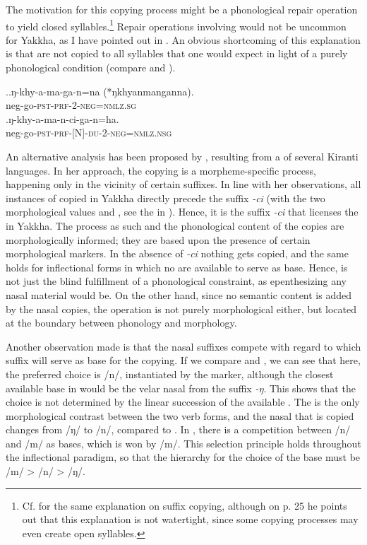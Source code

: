 	
The motivation for this copying process might be a phonological repair operation to yield closed syllables.\footnote{Cf. \citet[22]{Schikowski2012_Morphology} for the same explanation on  suffix copying, although on p. 25 he points out that this explanation is not watertight, since some copying processes may even create open syllables.} Repair operations involving  would not be uncommon for Yakkha, as I have pointed out in . An obvious shortcoming of this explanation is that  are not copied to all syllables that one would expect in light of a purely phonological condition (compare \Next[a] and \Next[b]). 


\ex.\ag.ŋ-khy-a-ma-ga-n=na (*ŋkhyanmanganna).\\
{\sc neg-}go\textsc{-pst-prf-2-neg=nmlz.sg}\\
\bg.ŋ-khy-a-ma-n-ci-ga-n=ha.\\
{\sc neg-}go\textsc{-pst-prf-[N]-du-2-neg=nmlz.nsg}\\


An alternative analysis has been proposed by \citet{Zimmermann2012_Affix}, resulting from a  of several Kiranti languages. In her approach, the copying is a morpheme-specific process, happening only in the vicinity of certain suffixes. In line with her observations, all instances of copied  in Yakkha directly precede the suffix  \emph{-ci} (with the two morphological values  and , see the  in ). Hence, it is the suffix \emph{-ci} that licenses the  in Yakkha. The process as such and the phonological content of the copies are morphologically informed; they are based upon the presence of certain morphological markers. In the absence of \emph{-ci} nothing gets copied, and the same holds for inflectional forms in which no  are available to serve as base. Hence,  is not just the blind fulfillment of a phonological constraint, as epenthesizing any nasal material would be. On the other hand, since no semantic content is added by the nasal copies, the operation is not purely morphological either, but located at the boundary between phonology and morphology.


Another observation made is that the nasal suffixes compete with regard to which suffix will serve as base for the copying. If we compare \Next[a] and \Next[b], we can see that here, the preferred choice is /n/, instantiated by  the  marker, although the closest available base in \Next[b] would be the velar nasal from the suffix \emph{-ŋ}. This shows that the choice is not determined by the linear succession of the available . The  is the only morphological contrast between the two verb forms, and the nasal that is copied changes from /ŋ/ to /n/, compared to \Next[a].  In \Next[c], there is a competition between /n/ and /m/ as bases, which is won by /m/. This selection principle holds throughout the inflectional paradigm, so that the hierarchy for the choice of the base must be /m/ > /n/ > /ŋ/.


